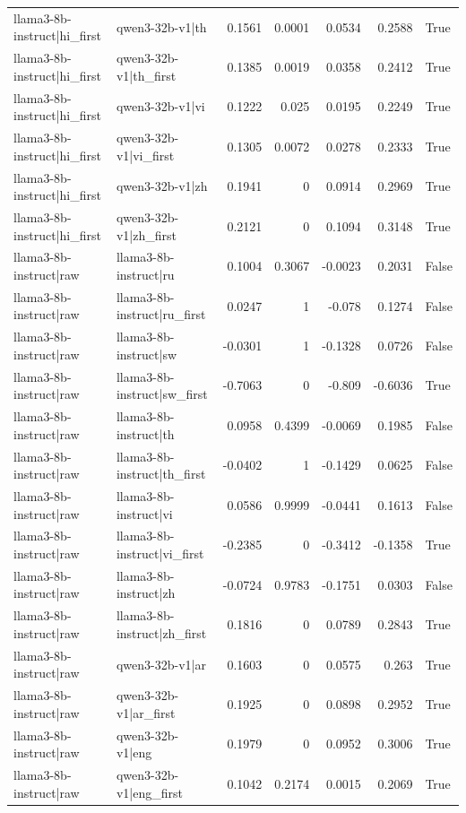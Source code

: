\begin{table}
\begin{tabular}{l l r r r r l}
llama3-8b-instruct|hi_first & qwen3-32b-v1|th & 0.1561 & 0.0001 & 0.0534 & 0.2588 & True \\
llama3-8b-instruct|hi_first & qwen3-32b-v1|th_first & 0.1385 & 0.0019 & 0.0358 & 0.2412 & True \\
llama3-8b-instruct|hi_first & qwen3-32b-v1|vi & 0.1222 & 0.025 & 0.0195 & 0.2249 & True \\
llama3-8b-instruct|hi_first & qwen3-32b-v1|vi_first & 0.1305 & 0.0072 & 0.0278 & 0.2333 & True \\
llama3-8b-instruct|hi_first & qwen3-32b-v1|zh & 0.1941 & 0 & 0.0914 & 0.2969 & True \\
llama3-8b-instruct|hi_first & qwen3-32b-v1|zh_first & 0.2121 & 0 & 0.1094 & 0.3148 & True \\
llama3-8b-instruct|raw & llama3-8b-instruct|ru & 0.1004 & 0.3067 & -0.0023 & 0.2031 & False \\
llama3-8b-instruct|raw & llama3-8b-instruct|ru_first & 0.0247 & 1 & -0.078 & 0.1274 & False \\
llama3-8b-instruct|raw & llama3-8b-instruct|sw & -0.0301 & 1 & -0.1328 & 0.0726 & False \\
llama3-8b-instruct|raw & llama3-8b-instruct|sw_first & -0.7063 & 0 & -0.809 & -0.6036 & True \\
llama3-8b-instruct|raw & llama3-8b-instruct|th & 0.0958 & 0.4399 & -0.0069 & 0.1985 & False \\
llama3-8b-instruct|raw & llama3-8b-instruct|th_first & -0.0402 & 1 & -0.1429 & 0.0625 & False \\
llama3-8b-instruct|raw & llama3-8b-instruct|vi & 0.0586 & 0.9999 & -0.0441 & 0.1613 & False \\
llama3-8b-instruct|raw & llama3-8b-instruct|vi_first & -0.2385 & 0 & -0.3412 & -0.1358 & True \\
llama3-8b-instruct|raw & llama3-8b-instruct|zh & -0.0724 & 0.9783 & -0.1751 & 0.0303 & False \\
llama3-8b-instruct|raw & llama3-8b-instruct|zh_first & 0.1816 & 0 & 0.0789 & 0.2843 & True \\
llama3-8b-instruct|raw & qwen3-32b-v1|ar & 0.1603 & 0 & 0.0575 & 0.263 & True \\
llama3-8b-instruct|raw & qwen3-32b-v1|ar_first & 0.1925 & 0 & 0.0898 & 0.2952 & True \\
llama3-8b-instruct|raw & qwen3-32b-v1|eng & 0.1979 & 0 & 0.0952 & 0.3006 & True \\
llama3-8b-instruct|raw & qwen3-32b-v1|eng_first & 0.1042 & 0.2174 & 0.0015 & 0.2069 & True \\

\end{tabular}
\end{table}
